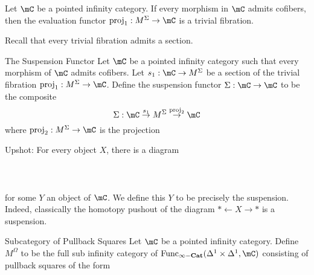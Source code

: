 \documentclass[a4paper]{article}
\begin{document}
\begin{lmm}{}{} Let $\mC$ be a pointed infinity category. If every morphism in $\mC$ admits cofibers, then the evaluation functor $\text{proj}_1:M^\Sigma\to\mC$ is a trivial fibration. 
\end{lmm}

Recall that every trivial fibration admits a section. 

\begin{defn}{The Suspension Functor}{} Let $\mC$ be a pointed infinity category such that every morphism of $\mC$ admits cofibers. Let $s_1:\mC\to M^\Sigma$ be a section of the trivial fibration $\text{proj}_1:M^\Sigma\to\mC$. Define the suspension functor $\Sigma:\mC\to\mC$ to be the composite $$\Sigma:\mC\overset{s_1}{\rightarrow}M^\Sigma\overset{\text{proj}_2}{\rightarrow}\mC$$ where $\text{proj}_2:M^\Sigma\to\mC$ is the projection 
\end{defn}

Upshot: For every object $X$, there is a diagram \\~\\
\\~\\
for some $Y$ an object of $\mC$. We define this $Y$ to be precisely the suspension. Indeed, classically the homotopy pushout of the diagram $\ast\leftarrow X\rightarrow\ast$ is a suspension. 

\begin{defn}{Subcategory of Pullback Squares}{} Let $\mC$ be a pointed infinity category. Define $M^\Omega$ to be the full sub infinity category of $\text{Func}_\bold{\infty-\bold{Cat}}(\Delta^1\times\Delta^1,\mC)$ consisting of pullback squares of the form \\~\\
\\~\\
\end{defn}
\end{document}
